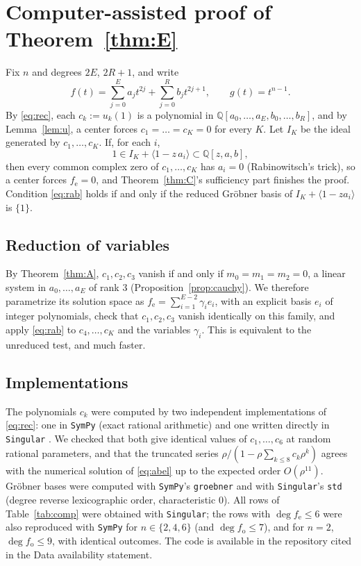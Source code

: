 \documentclass[11pt]{amsart}
\numberwithin{equation}{section}
\theoremstyle{plain}
\theoremstyle{definition}
\theoremstyle{remark}
\newcommand{\Q}{\mathbb{Q}}
\newcommand{\fe}{f_{\mathrm e}}
\newcommand{\fo}{f_{\mathrm o}}
\begin{document}
\section{Computer-assisted proof of Theorem~\ref{thm:E}}\label{sec:comp}

Fix $n$ and degrees $2E$, $2R+1$, and write
\[
 f(t)=\sum_{j=0}^{E}a_jt^{2j}+\sum_{j=0}^{R}b_jt^{2j+1},\qquad g(t)=t^{n-1}.
\]
By \eqref{eq:rec}, each $c_k:=u_k(1)$ is a polynomial in
$\Q[a_0,\dots,a_E,b_0,\dots,b_R]$, and by Lemma~\ref{lem:u}, a center forces
$c_1=\dots=c_K=0$ for every $K$. Let $I_K$ be the ideal generated by
$c_1,\dots,c_K$. If, for each $i$,
\begin{equation}\label{eq:rab}
 1\in I_K+\langle 1-z\,a_i\rangle\subset\Q[z,a,b],
\end{equation}
then every common complex zero of $c_1,\dots,c_K$ has $a_i=0$ (Rabinowitsch's
trick), so a center forces $\fe=0$, and Theorem~\ref{thm:C}'s sufficiency part
finishes the proof. Condition \eqref{eq:rab} holds if and only if the reduced
Gr\"obner basis of $I_K+\langle1-za_i\rangle$ is $\{1\}$.

\subsection*{Reduction of variables}
By Theorem~\ref{thm:A}, $c_1,c_2,c_3$ vanish if and only if $m_0=m_1=m_2=0$, a
linear system in $a_0,\dots,a_E$ of rank $3$ (Proposition~\ref{prop:cauchy}). We
therefore parametrize its solution space as $\fe=\sum_{i=1}^{E-2}\gamma_ie_i$, with
an explicit basis $e_i$ of integer polynomials, check that $c_1,c_2,c_3$ vanish
identically on this family, and apply \eqref{eq:rab} to $c_4,\dots,c_K$ and the
variables $\gamma_i$. This is equivalent to the unreduced test, and much faster.

\subsection*{Implementations}
The polynomials $c_k$ were computed by two independent implementations of
\eqref{eq:rec}: one in \texttt{SymPy} (exact rational arithmetic) and one written
directly in \texttt{Singular} \cite{Singular}. We checked that both give identical
values of $c_1,\dots,c_6$ at random rational parameters, and that the truncated
series $\rho/(1-\rho\sum_{k\le8}c_k\rho^k)$ agrees with the numerical solution of
\eqref{eq:abel} up to the expected order $O(\rho^{11})$. Gr\"obner bases were
computed with \texttt{SymPy}'s \texttt{groebner} and with \texttt{Singular}'s
\texttt{std} (degree reverse lexicographic order, characteristic $0$). All rows of
Table~\ref{tab:comp} were obtained with \texttt{Singular}; the rows with
$\deg\fe\le6$ were also reproduced with \texttt{SymPy} for $n\in\{2,4,6\}$ (and
$\deg\fo\le7$), and for $n=2$, $\deg\fo\le9$, with identical outcomes. The code is available in the repository
cited in the Data availability statement.
\end{document}
